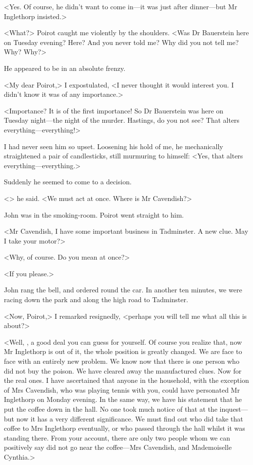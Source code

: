  <Yes. Of course, he didn't want to come in—it was just after dinner—but Mr Inglethorp insisted.> 

 <What?> Poirot caught me violently by the shoulders. <Was Dr Bauerstein here on Tuesday evening? Here? And you never told me? Why did you not tell me? Why? Why?> 

 He appeared to be in an absolute frenzy. 

 <My dear Poirot,> I expostulated, <I never thought it would interest you. I didn't know it was of any importance.> 

 <Importance? It is of the first importance! So Dr Bauerstein was here on Tuesday night—the night of the murder. Hastings, do you not see? That alters everything—everything!> 

 I had never seen him so upset. Loosening his hold of me, he mechanically straightened a pair of candlesticks, still murmuring to himself: <Yes, that alters everything—everything.> 

 Suddenly he seemed to come to a decision. 

 <> he said. <We must act at once. Where is Mr Cavendish?> 

 John was in the smoking-room. Poirot went straight to him. 

 <Mr Cavendish, I have some important business in Tadminster. A new clue. May I take your motor?> 

 <Why, of course. Do you mean at once?> 

 <If you please.> 

 John rang the bell, and ordered round the car. In another ten minutes, we were racing down the park and along the high road to Tadminster. 

 <Now, Poirot,> I remarked resignedly, <perhaps you will tell me what all this is about?> 

 <Well, , a good deal you can guess for yourself. Of course you realize that, now Mr Inglethorp is out of it, the whole position is greatly changed. We are face to face with an entirely new problem. We know now that there is one person who did not buy the poison. We have cleared away the manufactured clues. Now for the real ones. I have ascertained that anyone in the household, with the exception of Mrs Cavendish, who was playing tennis with you, could have personated Mr Inglethorp on Monday evening. In the same way, we have his statement that he put the coffee down in the hall. No one took much notice of that at the inquest—but now it has a very different significance. We must find out who did take that coffee to Mrs Inglethorp eventually, or who passed through the hall whilst it was standing there. From your account, there are only two people whom we can positively say did not go near the coffee—Mrs Cavendish, and Mademoiselle Cynthia.> 

